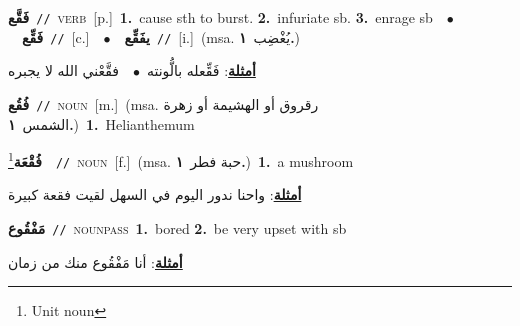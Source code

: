 \documentclass[10pt,a4paper,twoside]{article} %
\begin{document}
\begin{multicols}{2}
{\setlength\topsep{0pt}\textbf{\foreignlanguage{arabic}{فَقَّع}}\ {\color{gray}\texttt{//}\color{black}}\ \textsc{verb}\ [p.]\ \textbf{1.}~cause sth to burst.  \textbf{2.}~infuriate sb.  \textbf{3.}~enrage sb\ \ $\bullet$\ \ \setlength\topsep{0pt}\textbf{\foreignlanguage{arabic}{فَقِّع}}\ {\color{gray}\texttt{//}\color{black}}\ [c.]\ \ $\bullet$\ \ \setlength\topsep{0pt}\textbf{\foreignlanguage{arabic}{يفَقِّع}}\ {\color{gray}\texttt{//}\color{black}}\ [i.]\ \color{gray}(msa. \foreignlanguage{arabic}{يُغْضِب}~\foreignlanguage{arabic}{\textbf{١.}})\color{black}\  \begin{flushright}\color{gray}\foreignlanguage{arabic}{\textbf{\underline{\foreignlanguage{arabic}{أمثلة}}}: فَقِّعله بالُّونته\ $\bullet$\ \  فقَّعْني الله لا يجبره}\end{flushright}\color{black}} \vspace{2mm}

{\setlength\topsep{0pt}\textbf{\foreignlanguage{arabic}{فُقُع}}\ {\color{gray}\texttt{//}\color{black}}\ \textsc{noun}\ [m.]\ \color{gray}(msa. \foreignlanguage{arabic}{رقروق أو الهشيمة أو زهرة الشمس}~\foreignlanguage{arabic}{\textbf{١.}})\color{black}\ \textbf{1.}~Helianthemum\ } \vspace{2mm}

{\setlength\topsep{0pt}\textbf{\foreignlanguage{arabic}{فُقْعَة}}\footnote{Unit noun}\ \ {\color{gray}\texttt{//}\color{black}}\ \textsc{noun}\ [f.]\ \color{gray}(msa. \foreignlanguage{arabic}{حبة فطر}~\foreignlanguage{arabic}{\textbf{١.}})\color{black}\ \textbf{1.}~a mushroom\  \begin{flushright}\color{gray}\foreignlanguage{arabic}{\textbf{\underline{\foreignlanguage{arabic}{أمثلة}}}: واحنا ندور اليوم في السهل لقيت فقعة كبيرة}\end{flushright}\color{black}} \vspace{2mm}

{\setlength\topsep{0pt}\textbf{\foreignlanguage{arabic}{مَفْقُوع}}\ {\color{gray}\texttt{//}\color{black}}\ \textsc{noun\textunderscore pass}\ \textbf{1.}~bored  \textbf{2.}~be very upset with sb\  \begin{flushright}\color{gray}\foreignlanguage{arabic}{\textbf{\underline{\foreignlanguage{arabic}{أمثلة}}}: أنا مَفْقُوع منك من زمان}\end{flushright}\color{black}} \vspace{2mm}


\end{multicols}
\end{document}
